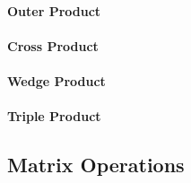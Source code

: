 


\paragraph{Outer Product}

\paragraph{Cross Product}

\paragraph{Wedge Product}

\paragraph{Triple Product}











\subsection{Matrix Operations}

